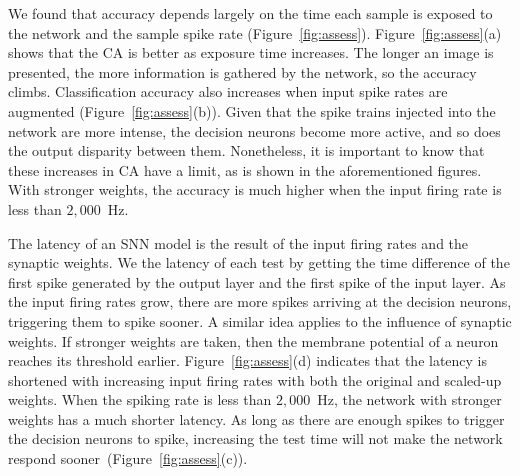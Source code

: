 \documentclass{frontiersENG} %
\providecommand{\DIFaddtex}[1]{{\protect\color{blue}\uwave{#1}}} %
\providecommand{\DIFaddbegin}{} %
\providecommand{\DIFaddend}{} %
\providecommand{\DIFadd}[1]{\texorpdfstring{\DIFaddtex{#1}}{#1}} %
\begin{document}
We found that accuracy depends largely on the time each sample is exposed to the network and the sample spike rate (Figure~\ref{fig:assess}).
Figure~\ref{fig:assess}(a) shows that the CA is better as exposure time increases. The longer an image is presented, the more information is gathered by the network, so the accuracy climbs.
Classification accuracy also increases when input spike rates are augmented (Figure~\ref{fig:assess}(b)).
Given that the spike trains injected into the network are more intense, the decision neurons become more active, and so does the output disparity between them.
Nonetheless, it is important to know that these increases in CA have a limit, as is shown in the aforementioned figures.
With stronger weights, the accuracy is much higher when the input firing rate is less than $2,000$~Hz.


The latency of an SNN model is the result of the input firing rates and the synaptic weights.
We \DIFaddbegin \DIFadd{measured }\DIFaddend the latency of each test by getting the time difference of the first spike generated by \DIFaddbegin \DIFadd{any decision neuron in  }\DIFaddend the output layer and the first spike of the input layer.
As the input firing rates grow, there are more spikes arriving at the decision neurons, triggering them to spike sooner.
A similar idea applies to the influence of synaptic weights.
If stronger weights are taken, then the membrane potential of a neuron reaches its threshold earlier.
Figure~\ref{fig:assess}(d) indicates that the latency is shortened with increasing input firing rates with both the original and scaled-up weights.
When the spiking rate is less than $2,000$~Hz, the network with stronger weights has a much shorter latency.
As long as there are enough spikes to trigger the decision neurons to spike, increasing the test time will not make the network respond sooner~(Figure~\ref{fig:assess}(c)).
\end{document}
